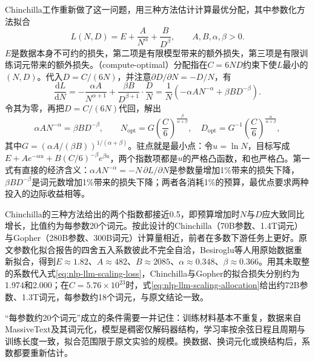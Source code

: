 Chinchilla工作重新做了这一问题，用三种方法估计计算最优分配，其中参数化方法拟合
\begin{equation}
 L(N,D)=E+\frac{A}{N^{\alpha}}+\frac{B}{D^{\beta}},
 \qquad A,B,\alpha,\beta>0.
 \label{eq:nlp-llm-scaling-loss}
\end{equation}
$E$是数据本身不可约的损失，第二项是有限模型带来的额外损失，第三项是有限训练词元带来的额外损失。（compute-optimal）分配指在$C=6ND$约束下使$L$最小的$(N,D)$。代入$D=C/(6N)$，并注意$\partial D/\partial N=-D/N$，有
\begin{equation*}
 \frac{\mathrm dL}{\mathrm dN}
 =-\frac{\alpha A}{N^{\alpha+1}}+\frac{\beta B}{D^{\beta+1}}\cdot\frac{D}{N}
 =\frac1N\left(-\alpha AN^{-\alpha}+\beta BD^{-\beta}\right).
\end{equation*}
令其为零，再把$D=C/(6N)$代回，解出
\begin{equation}
 \alpha AN^{-\alpha}=\beta BD^{-\beta},\qquad
 N_{\mathrm{opt}}=G\left(\frac C6\right)^{\frac{\beta}{\alpha+\beta}},\quad
 D_{\mathrm{opt}}=G^{-1}\left(\frac C6\right)^{\frac{\alpha}{\alpha+\beta}},
 \label{eq:nlp-llm-scaling-allocation}
\end{equation}
其中$G=(\alpha A/(\beta B))^{1/(\alpha+\beta)}$。驻点就是最小点：令$u=\ln N$，目标写成$E+Ae^{-\alpha u}+B(C/6)^{-\beta}e^{\beta u}$，两个指数项都是$u$的严格凸函数，和也严格凸。第一式有直接的经济含义：$\alpha AN^{-\alpha}=-N\,\partial L/\partial N$是参数量增加1\%带来的损失下降，$\beta BD^{-\beta}$是词元数增加1\%带来的损失下降；两者各消耗1\%的预算，最优点要求两种投入的边际收益相等。

Chinchilla的三种方法给出的两个指数都接近0.5，即预算增加时$N$与$D$应大致同比增长，比值约为每参数20个词元。按此设计的Chinchilla（70B参数、1.4T词元）与Gopher（280B参数、300B词元）计算量相近，前者在多数下游任务上更好。原文参数化拟合报告的四舍五入系数彼此不完全自洽，Besiroglu等人用原始数据重新拟合，得到$E\approx1.82$、$A\approx482$、$B\approx2085$、$\alpha\approx0.348$、$\beta\approx0.366$。用其未取整的系数代入式\eqref{eq:nlp-llm-scaling-loss}，Chinchilla与Gopher的拟合损失分别约为1.974和2.000；在$C=5.76\times10^{23}$时，式\eqref{eq:nlp-llm-scaling-allocation}给出约72B参数、1.3T词元，每参数约18个词元，与原文结论一致。

“每参数约20个词元”成立的条件需要一并记住：训练材料基本不重复，数据来自MassiveText及其词元化，模型是稠密仅解码器结构，学习率按余弦日程且周期与训练长度一致，拟合范围限于原文实验的规模。换数据、换词元化或换结构后，系数都要重新估计。

